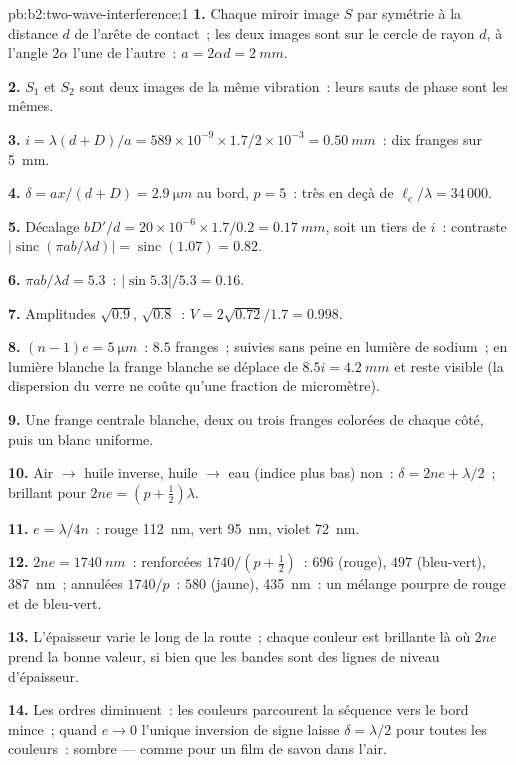 \begin{solution}{pb:b2:two-wave-interference:1}
\textbf{1.} Chaque miroir image $S$ par symétrie à la distance $d$ de
l'arête de contact~; les deux images sont sur le cercle de rayon $d$, à
l'angle $2\alpha$ l'une de l'autre~: $a = 2\alpha d = \qty{2}{mm}$.

\textbf{2.} $S_1$ et $S_2$ sont deux images de la même vibration~: leurs
sauts de phase sont les mêmes.

\textbf{3.} $i = \lambda(d + D)/a = 589 \times 10^{-9} \times 1.7/2 \times 10^{-3} = \qty{0.50}{mm}$~: dix
franges sur \qty{5}{mm}.

\textbf{4.} $\delta = ax/(d + D) = \qty{2.9}{\micro m}$ au bord, $p = 5$~: très en deçà de
$\ell_c/\lambda = 34\,000$.

\textbf{5.} Décalage $bD'/d = 20 \times 10^{-6} \times 1.7/0.2 = \qty{0.17}{mm}$, soit un tiers de
$i$~: contraste $|\operatorname{sinc}(\pi ab/\lambda d)| = \operatorname{sinc}(1.07) = 0.82$.

\textbf{6.} $\pi ab/\lambda d = 5.3$~: $|\sin5.3|/5.3 = 0.16$.

\textbf{7.} Amplitudes $\sqrt{0.9}$, $\sqrt{0.8}$~: $V = 2\sqrt{0.72}/1.7 = 0.998$.

\textbf{8.} $(n - 1)e = \qty{5}{\micro m}$~: $8.5$ franges~; suivies sans peine en
lumière de sodium~; en lumière blanche la frange blanche se déplace de $8.5i = \qty{4.2}{mm}$
et reste visible (la dispersion du verre ne coûte qu'une fraction de
micromètre).

\textbf{9.} Une frange centrale blanche, deux ou trois franges colorées de
chaque côté, puis un blanc uniforme.

\textbf{10.} Air $\to$ huile inverse, huile $\to$ eau (indice plus bas) non~:
$\delta = 2ne + \lambda/2$~; brillant pour $2ne = (p + \tfrac12)\lambda$.

\textbf{11.} $e = \lambda/4n$~: rouge \qty{112}{nm}, vert \qty{95}{nm}, violet \qty{72}{nm}.

\textbf{12.} $2ne = \qty{1740}{nm}$~: renforcées $1740/(p + \tfrac12)$~: $696$ (rouge), $497$
(bleu-vert), \qty{387}{nm}~; annulées $1740/p$~: $580$ (jaune), \qty{435}{nm}~:
un mélange pourpre de rouge et de bleu-vert.

\textbf{13.} L'épaisseur varie le long de la route~; chaque couleur est brillante
là où $2ne$ prend la bonne valeur, si bien que les bandes sont des lignes de niveau
d'épaisseur.

\textbf{14.} Les ordres diminuent~: les couleurs parcourent la séquence
vers le bord mince~; quand $e \to 0$ l'unique inversion de signe laisse
$\delta = \lambda/2$ pour toutes les couleurs~: sombre --- comme pour un film de savon dans l'air.


\end{solution}
